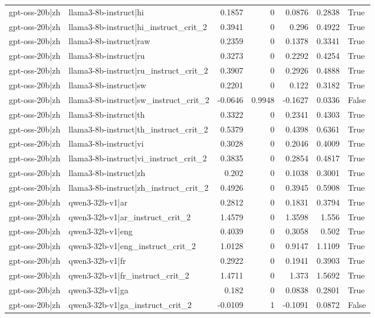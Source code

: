 \begin{table}
\begin{tabular}{l l r r r r l}
gpt-oss-20b|zh & llama3-8b-instruct|hi & 0.1857 & 0 & 0.0876 & 0.2838 & True \\
gpt-oss-20b|zh & llama3-8b-instruct|hi_instruct_crit_2 & 0.3941 & 0 & 0.296 & 0.4922 & True \\
gpt-oss-20b|zh & llama3-8b-instruct|raw & 0.2359 & 0 & 0.1378 & 0.3341 & True \\
gpt-oss-20b|zh & llama3-8b-instruct|ru & 0.3273 & 0 & 0.2292 & 0.4254 & True \\
gpt-oss-20b|zh & llama3-8b-instruct|ru_instruct_crit_2 & 0.3907 & 0 & 0.2926 & 0.4888 & True \\
gpt-oss-20b|zh & llama3-8b-instruct|sw & 0.2201 & 0 & 0.122 & 0.3182 & True \\
gpt-oss-20b|zh & llama3-8b-instruct|sw_instruct_crit_2 & -0.0646 & 0.9948 & -0.1627 & 0.0336 & False \\
gpt-oss-20b|zh & llama3-8b-instruct|th & 0.3322 & 0 & 0.2341 & 0.4303 & True \\
gpt-oss-20b|zh & llama3-8b-instruct|th_instruct_crit_2 & 0.5379 & 0 & 0.4398 & 0.6361 & True \\
gpt-oss-20b|zh & llama3-8b-instruct|vi & 0.3028 & 0 & 0.2046 & 0.4009 & True \\
gpt-oss-20b|zh & llama3-8b-instruct|vi_instruct_crit_2 & 0.3835 & 0 & 0.2854 & 0.4817 & True \\
gpt-oss-20b|zh & llama3-8b-instruct|zh & 0.202 & 0 & 0.1038 & 0.3001 & True \\
gpt-oss-20b|zh & llama3-8b-instruct|zh_instruct_crit_2 & 0.4926 & 0 & 0.3945 & 0.5908 & True \\
gpt-oss-20b|zh & qwen3-32b-v1|ar & 0.2812 & 0 & 0.1831 & 0.3794 & True \\
gpt-oss-20b|zh & qwen3-32b-v1|ar_instruct_crit_2 & 1.4579 & 0 & 1.3598 & 1.556 & True \\
gpt-oss-20b|zh & qwen3-32b-v1|eng & 0.4039 & 0 & 0.3058 & 0.502 & True \\
gpt-oss-20b|zh & qwen3-32b-v1|eng_instruct_crit_2 & 1.0128 & 0 & 0.9147 & 1.1109 & True \\
gpt-oss-20b|zh & qwen3-32b-v1|fr & 0.2922 & 0 & 0.1941 & 0.3903 & True \\
gpt-oss-20b|zh & qwen3-32b-v1|fr_instruct_crit_2 & 1.4711 & 0 & 1.373 & 1.5692 & True \\
gpt-oss-20b|zh & qwen3-32b-v1|ga & 0.182 & 0 & 0.0838 & 0.2801 & True \\
gpt-oss-20b|zh & qwen3-32b-v1|ga_instruct_crit_2 & -0.0109 & 1 & -0.1091 & 0.0872 & False \\

\end{tabular}
\end{table}
